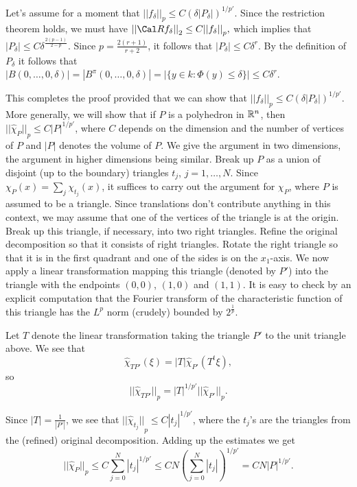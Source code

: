 Let's assume for a moment that ${||f_{\delta}||}_p \leq C 
{(\delta |P_{\delta}|)}^{1/p'}$. Since the 
restriction theorem holds, we must have ${||{\Cal R}f_{\delta}||}_2 \leq 
C{||f_{\delta}||}_p,$ which implies that $|P_{\delta}| \leq C{\delta}^
{\frac{2(p-1)}{2-p}}$. Since $p=\frac{2(r+1)}{r+2}$, it follows that 
$|P_{\delta}| \leq C{\delta}^r$. By the  definition of $P_{\delta}$ it follows 
that $|B(0, \dots, 0, \delta)|=|B^{\pi}(0, \dots, 0, \delta)|=
|\{y \in k: \Phi(y) \leq \delta \}| \leq 
C{\delta}^r$. 

This completes the proof provided that we can show that 
${||f_{\delta}||}_p \leq C{(\delta |P_{\delta}|)}^{1/p'}$. More generally, 
we will show that if $P$ is a polyhedron in ${\Bbb R}^n$, then 
${||\widehat{\chi}_{P}||}_p \leq C{|P|}^{1/p'}$, where $C$ depends on the
dimension and the number of vertices of $P$ 
and $|P|$ denotes the volume of $P$. We give the argument in 
two dimensions, the argument in higher dimensions being similar. Break up
$P$ as a union of disjoint (up to the boundary) triangles $t_j$, $j=1, \dots
,N$. Since $\chi_{P}(x)=\sum_{j} \chi_{t_j}(x)$, it suffices to carry out
the argument for $\chi_P$, where $P$ is assumed to be a triangle. Since 
translations don't contribute anything in this context, we may assume that
one of the vertices of the triangle is at the origin. Break up this
triangle, if necessary, into two right triangles. Refine the original
decomposition so that it consists of right triangles. Rotate the right
triangle so that it is in the first quadrant and one of the sides is on
the $x_1$-axis. We now apply a linear transformation mapping this
triangle (denoted by $P'$) into the triangle with the endpoints 
$(0,0)$, $(1,0)$ and
$(1,1)$. It is easy to check by an explicit computation that the Fourier
transform of the characteristic function of this triangle has the $L^p$
norm (crudely) bounded by $2^{\frac{1}{p}}$. 

Let $T$ denote the linear 
transformation taking the triangle $P'$ to the unit triangle above. 
We see that
$$ \widehat{\chi}_{TP'}(\xi)=|T| \widehat{\chi}_{P'}(T^t\xi),$$ so 
$${||\widehat{\chi}_{TP'}||}_p={|T|}^{1/p'} {||\widehat{\chi}_{P'}||}_p.$$ 

Since $|T|=\frac{1}{|P'|}$, we see that ${||\widehat{\chi}_{t_j}||}_p \leq 
C{|t_j|}^{1/p'}$, where the $t_j$'s are the triangles from the (refined)
original decomposition. Adding up the estimates we get 
$${||\widehat{\chi}_{P}||}_p \leq C \sum_{j=0}^{N} {|t_j|}^{1/p'} \leq 
CN {(\sum_{j=0}^N |t_j|)}^{1/p'}=CN{|P|}^{1/p'}.$$  

